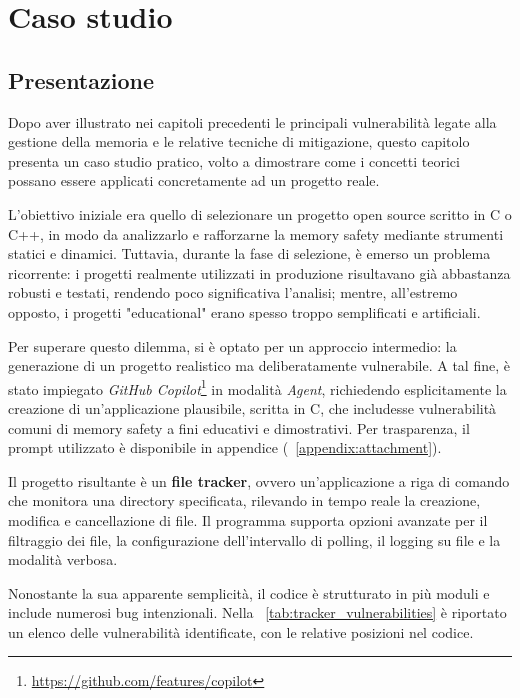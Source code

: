 \chapter{Caso studio}
\label{chap:real_case}

\section{Presentazione}
\label{sec:presentation}

Dopo aver illustrato nei capitoli precedenti le principali vulnerabilità legate alla
gestione della memoria e le relative tecniche di mitigazione, questo capitolo
presenta un caso studio pratico, volto a dimostrare come i concetti teorici possano
essere applicati concretamente ad un progetto reale.

L'obiettivo iniziale era quello di selezionare un progetto open source scritto in
C o C++, in modo da analizzarlo e rafforzarne la memory safety mediante
strumenti statici e dinamici. Tuttavia, durante la fase di selezione, è emerso un
problema ricorrente: i progetti realmente utilizzati in produzione risultavano
già abbastanza robusti e testati, rendendo poco significativa l'analisi; mentre,
all'estremo opposto, i progetti "educational" erano spesso troppo semplificati e
artificiali.

Per superare questo dilemma, si è optato per un approccio intermedio: la
generazione di un progetto realistico ma deliberatamente vulnerabile. A tal fine,
è stato impiegato \textit{GitHub Copilot}\footnote{\url{https://github.com/features/copilot}}
in modalità \textit{Agent}, richiedendo esplicitamente la creazione di un'applicazione
plausibile, scritta in C, che includesse vulnerabilità comuni di memory safety a
fini educativi e dimostrativi. Per trasparenza, il prompt utilizzato è
disponibile in appendice (~\autoref{appendix:attachment}).

Il progetto risultante è un \textbf{file tracker}, ovvero un'applicazione a riga
di comando che monitora una directory specificata, rilevando in tempo reale la
creazione, modifica e cancellazione di file. Il programma supporta opzioni
avanzate per il filtraggio dei file, la configurazione dell'intervallo di polling,
il logging su file e la modalità verbosa.

Nonostante la sua apparente semplicità, il codice è strutturato in più moduli e include
numerosi bug intenzionali. Nella ~\autoref{tab:tracker_vulnerabilities} è riportato
un elenco delle vulnerabilità identificate, con le relative posizioni nel codice.

